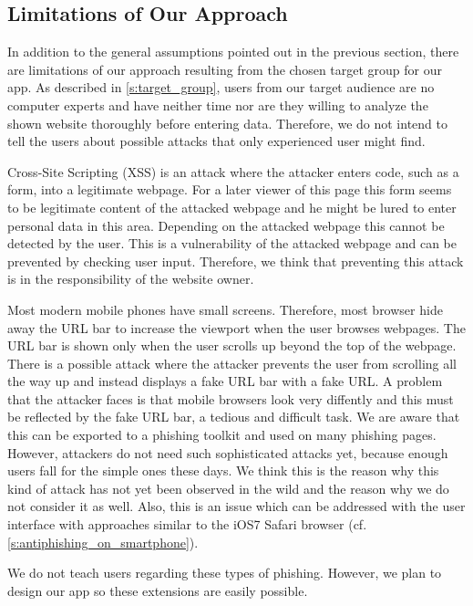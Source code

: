 \subsection{Limitations of Our Approach}
In addition to the general assumptions pointed out in the previous section, there are limitations of our approach resulting from the chosen target group for our app.
As described in \autoref{s:target_group}, users from our target audience are no computer experts and have neither time nor are they willing to analyze the shown website thoroughly before entering data.
Therefore, we do not intend to tell the users about possible attacks that only experienced user might find.
\begin{description}[leftmargin=0cm]
	\item[Cross-Site Scripting]
	Cross-Site Scripting (XSS) is an attack where the attacker enters code, such as a form, into a legitimate webpage.
	For a later viewer of this page this form seems to be legitimate content of the attacked webpage and he might be lured to enter personal data in this area. 
	Depending on the attacked webpage this cannot be detected by the user.
	This is a vulnerability of the attacked webpage and can be prevented by checking user input.
	Therefore, we think that preventing this attack is in the responsibility of the website owner.
	\item[URL Hiding Techniques]
	Most modern mobile phones have small screens.
	Therefore, most browser hide away the URL bar to increase the viewport when the user browses webpages.
	The URL bar is shown only when the user scrolls up beyond the top of the webpage.
	There is a possible attack where the attacker prevents the user from scrolling all the way up and instead displays a fake URL bar with a fake URL.
	A problem that the attacker faces is that mobile browsers look very diffently and this must be reflected by the fake URL bar, a tedious and difficult task.
	We are aware that this can be exported to a phishing toolkit and used on many phishing pages. However, attackers do not need such sophisticated attacks yet, because enough users fall for the simple ones these days. 
	We think this is the reason why this kind of attack has not yet been observed in the wild and the reason why we do not consider it as well.
Also, this is an issue which can be addressed with the user interface with approaches similar to the iOS7 Safari browser (cf. \autoref{s:antiphishing_on_smartphone}).
\end{description}

We do not teach users regarding these types of phishing. However, we plan to design our app so these extensions are easily possible.